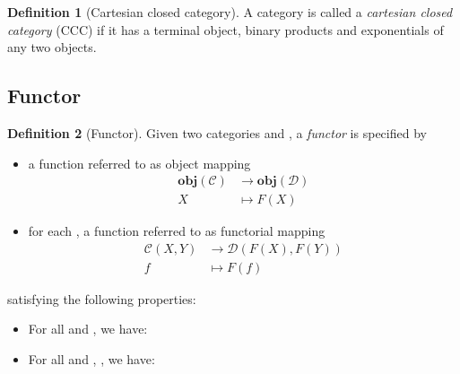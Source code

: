 \documentclass[12pt,a4paper]{report}
\theoremstyle{definition}
\newtheorem{definition}{Definition}[chapter]
\begin{document}
        \begin{definition}[Cartesian closed category]
            A category  is called a \emph{cartesian closed category} (CCC) if it has a terminal object, binary products and exponentials of any two objects.
        \end{definition}

        
        \subsection{Functor}
        \begin{definition}[Functor] \label{def: functor}
            Given two categories  and , a \emph{functor}  is specified by
            \begin{itemize}
                \item 
                    a function referred to as object mapping
                    \[\begin{aligned}
                        \textbf{obj}(\mathcal{C}) &\to \textbf{obj}(\mathcal{D}) \\
                        X &\mapsto F(X)
                    \end{aligned}\]

                \item 
                    for each , a function referred to as functorial mapping
                    \[\begin{aligned}
                        \mathcal{C}{(X,Y)} &\to \mathcal{D}{(F(X),F(Y))} \\
                        f &\mapsto F(f)
                    \end{aligned}\]
            \end{itemize}
            satisfying the following properties:
            \begin{itemize}
                \item 
                    For all  and , we have: 
                \item
                    For all  and , , we have: 
            \end{itemize}
        \end{definition}
\end{document}
